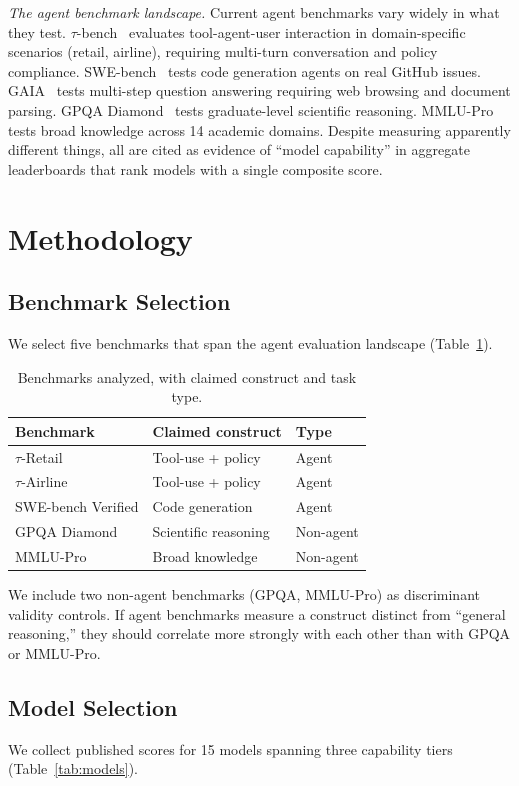 \documentclass[sigconf]{acmart}
\begin{document}
\textit{The agent benchmark landscape.} Current agent benchmarks vary widely in what they test. $\tau$-bench~\cite{yao2024taubench} evaluates tool-agent-user interaction in domain-specific scenarios (retail, airline), requiring multi-turn conversation and policy compliance. SWE-bench~\cite{jimenez2024swebench} tests code generation agents on real GitHub issues. GAIA~\cite{mialon2024gaia} tests multi-step question answering requiring web browsing and document parsing. GPQA Diamond~\cite{rein2024gpqa} tests graduate-level scientific reasoning. MMLU-Pro~\cite{wang2024mmlupro} tests broad knowledge across 14 academic domains. Despite measuring apparently different things, all are cited as evidence of ``model capability'' in aggregate leaderboards that rank models with a single composite score.

\section{Methodology}\label{sec:method}
\subsection{Benchmark Selection}
We select five benchmarks that span the agent evaluation landscape (Table~\ref{tab:benchmarks}).

\begin{table}[h]
\caption{Benchmarks analyzed, with claimed construct and task type.}
\label{tab:benchmarks}
\begin{tabular}{lll}
\toprule
Benchmark & Claimed construct & Type \\
\midrule
$\tau$-Retail & Tool-use + policy & Agent \\
$\tau$-Airline & Tool-use + policy & Agent \\
SWE-bench Verified & Code generation & Agent \\
GPQA Diamond & Scientific reasoning & Non-agent \\
MMLU-Pro & Broad knowledge & Non-agent \\
\bottomrule
\end{tabular}
\end{table}

We include two non-agent benchmarks (GPQA, MMLU-Pro) as discriminant validity controls. If agent benchmarks measure a construct distinct from ``general reasoning,'' they should correlate more strongly with each other than with GPQA or MMLU-Pro.

\subsection{Model Selection}
We collect published scores for 15 models spanning three capability tiers (Table~\ref{tab:models}).
\end{document}
